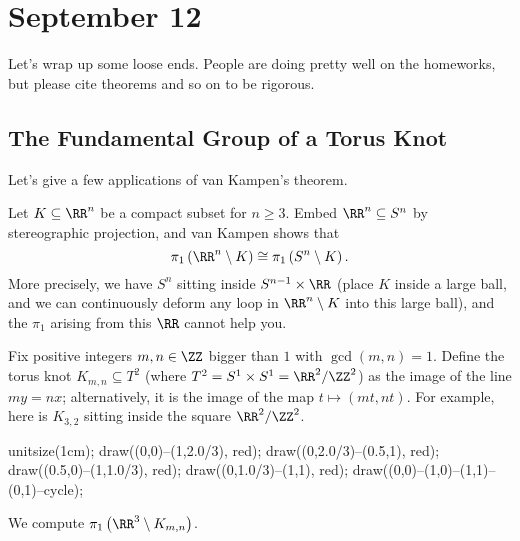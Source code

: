 \documentclass[../notes.tex]{subfiles}
\begin{document}
\section{September 12}

Let's wrap up some loose ends. People are doing pretty well on the homeworks, but please cite theorems and so on to be rigorous.

\subsection{The Fundamental Group of a Torus Knot}
Let's give a few applications of van Kampen's theorem.
\begin{example}
	Let $K\subseteq\RR^n$ be a compact subset for $n\ge3$. Embed $\RR^n\subseteq S^n$ by stereographic projection, and van Kampen shows that
	\[\pi_1\left(\RR^n\setminus K\right)\cong\pi_1\left(S^n\setminus K\right).\]
	More precisely, we have $S^n$ sitting inside $S^{n-1}\times\RR$ (place $K$ inside a large ball, and we can continuously deform any loop in $\RR^n\setminus K$ into this large ball), and the $\pi_1$ arising from this $\RR$ cannot help you.
\end{example}
\begin{example} \label{ex:torus-knot}
	Fix positive integers $m,n\in\ZZ$ bigger than $1$ with $\gcd(m,n)=1$. Define the torus knot $K_{m,n}\subseteq T^2$ (where $T^2=S^1\times S^1=\RR^2/\ZZ^2$) as the image of the line $my=nx$; alternatively, it is the image of the map $t\mapsto(mt,nt)$. For example, here is $K_{3,2}$ sitting inside the square $\RR^2/\ZZ^2$.
	\begin{center}
		\begin{asy}
			unitsize(1cm);
			draw((0,0)--(1,2.0/3), red);
			draw((0,2.0/3)--(0.5,1), red);
			draw((0.5,0)--(1,1.0/3), red);
			draw((0,1.0/3)--(1,1), red);
			draw((0,0)--(1,0)--(1,1)--(0,1)--cycle);
		\end{asy}
	\end{center}
	We compute $\pi_1\left(\RR^3\setminus K_{m,n}\right)$.
\end{example}
\end{document}
